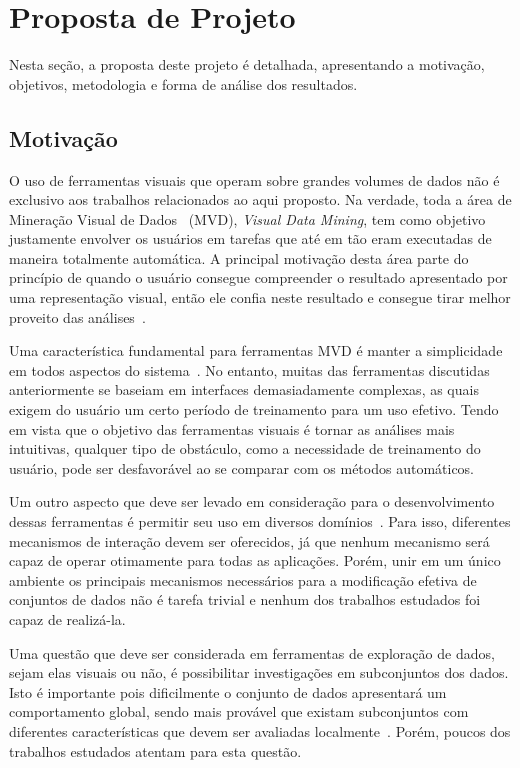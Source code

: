 \section{Proposta de Projeto}\label{sec:proposal}

Nesta seção, a proposta deste projeto é detalhada, apresentando a motivação, objetivos, metodologia e forma de análise dos resultados.

\subsection{Motivação}

O uso de ferramentas visuais que operam sobre grandes
volumes de dados não é exclusivo aos trabalhos relacionados
ao aqui proposto. Na verdade, toda a área de
Mineração Visual de Dados~\cite{Wong1999} (MVD),
\emph{Visual Data Mining}, tem como objetivo justamente
envolver os usuários em tarefas que até em tão eram
executadas de maneira totalmente automática. A principal
motivação desta área parte do princípio de quando o usuário
consegue compreender o resultado apresentado por uma
representação visual, então ele confia neste resultado e
consegue tirar melhor proveito das análises~\cite{Wong1999}.

Uma característica fundamental para ferramentas MVD é manter
a simplicidade em todos aspectos do sistema~\cite{Wong1999}.
No entanto, muitas das ferramentas discutidas anteriormente
se baseiam em interfaces demasiadamente complexas, as quais
exigem do usuário um certo período de treinamento para um
uso efetivo. Tendo em vista que o objetivo das ferramentas
visuais é tornar as análises mais intuitivas, qualquer tipo
de obstáculo, como a necessidade de treinamento do usuário,
pode ser desfavorável ao se comparar com os métodos
automáticos.

Um outro aspecto que deve ser levado em consideração para o
desenvolvimento dessas ferramentas é permitir seu uso em
diversos domínios~\cite{Wong1999}. Para isso, diferentes
mecanismos de interação devem ser oferecidos, já que nenhum
mecanismo será capaz de operar otimamente para todas as
aplicações. Porém, unir em um único ambiente os principais
mecanismos necessários para a modificação efetiva de
conjuntos de dados não é tarefa trivial e nenhum dos
trabalhos estudados foi capaz de realizá-la.

Uma questão que deve ser considerada em ferramentas de
exploração de dados, sejam elas visuais ou não, é
possibilitar investigações em subconjuntos dos dados. Isto é
importante pois dificilmente o conjunto de dados apresentará
um comportamento global, sendo mais provável que existam
subconjuntos com diferentes características que devem ser
avaliadas localmente~\cite{May2011}. Porém, poucos dos
trabalhos estudados atentam para esta questão.

